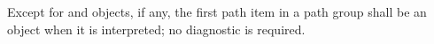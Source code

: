 %
%
\pnum
Except for  and  objects, if any, the first path item in a path group shall be an  object when it is interpreted; no diagnostic is required.
